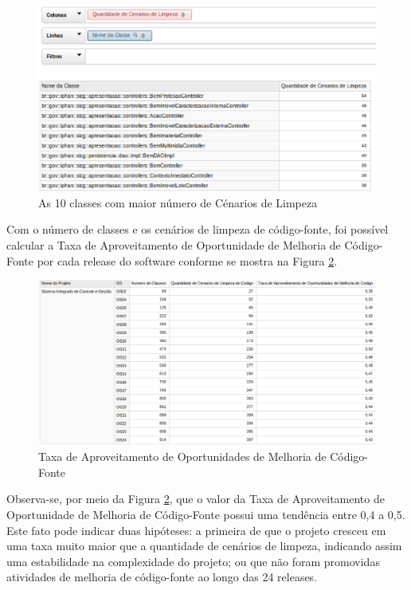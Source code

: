 \begin{figure}[ht!]
\centering
\includegraphics[keepaspectratio=true,scale=0.55]{figuras/10-best.eps}
\caption{As 10 classes com maior número de Cénarios de Limpeza}
\label{fig:worst-10-cenarios}
\end{figure}
\FloatBarrier

Com o número de classes e os cenários de limpeza de código-fonte, foi possível calcular a Taxa de Aproveitamento de Oportunidade de Melhoria de Código-Fonte por cada release do software conforme se mostra na Figura \ref{fig:taxa-cenarios}.

\begin{figure}[H]
\centering
\includegraphics[keepaspectratio=true,scale=0.38]{figuras/taxa-parcial.eps}
\caption{Taxa de Aproveitamento de Oportunidades de Melhoria de Código-Fonte}
\label{fig:taxa-cenarios}
\end{figure}
\FloatBarrier

Observa-se, por meio da Figura \ref{fig:taxa-cenarios}, que o valor da Taxa de Aproveitamento de Oportunidade de Melhoria de Código-Fonte possui uma tendência entre 0,4 a 0,5. Este fato pode indicar duas hipóteses: a primeira de que o projeto cresceu em uma taxa muito maior que a quantidade de cenários de limpeza, indicando assim uma estabilidade na complexidade do projeto; ou que não foram promovidas atividades de melhoria de código-fonte ao longo das 24 releases.
